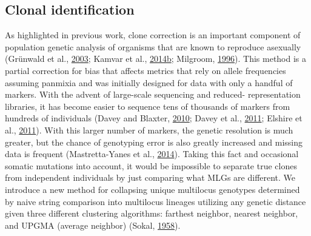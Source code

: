 \documentclass[double,12pt]{beavtex}
\begin{document}
  \subsection{Clonal identification}\label{clonal-identification}
  
  As highlighted in previous work, clone correction is an important
  component of population genetic analysis of organisms that are known to
  reproduce asexually (Grünwald et al.,
  \protect\hyperlink{ref-grunwald2003analysis}{2003}; Kamvar et al.,
  \protect\hyperlink{ref-kamvar2014poppr}{2014}\protect\hyperlink{ref-kamvar2014poppr}{b};
  Milgroom, \protect\hyperlink{ref-milgroom1996recombination}{1996}). This
  method is a partial correction for bias that affects metrics that rely
  on allele frequencies assuming panmixia and was initially designed for
  data with only a handful of markers. With the advent of large-scale
  sequencing and reduced- representation libraries, it has become easier
  to sequence tens of thousands of markers from hundreds of individuals
  (Davey and Blaxter, \protect\hyperlink{ref-davey2010rad}{2010}; Davey et
  al., \protect\hyperlink{ref-davey2011genome}{2011}; Elshire et al.,
  \protect\hyperlink{ref-elshire2011robust}{2011}). With this larger
  number of markers, the genetic resolution is much greater, but the
  chance of genotyping error is also greatly increased and missing data is
  frequent (Mastretta-Yanes et al.,
  \protect\hyperlink{ref-mastretta2015restriction}{2014}). Taking this
  fact and occasional somatic mutations into account, it would be
  impossible to separate true clones from independent individuals by just
  comparing what MLGs are different. We introduce a new method for
  collapsing unique multilocus genotypes determined by naive string
  comparison into multilocus lineages utilizing any genetic distance given
  three different clustering algorithms: farthest neighbor, nearest
  neighbor, and UPGMA (average neighbor) (Sokal,
  \protect\hyperlink{ref-sokal1958statistical}{1958}).
  
\end{document}
